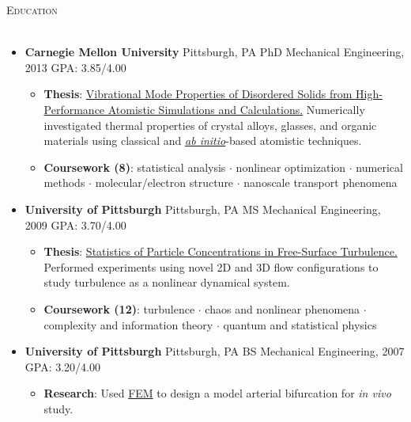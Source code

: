 \documentclass{article}
\newcommand{\area}[2]{\vspace*{-9pt} \begin{verse}\textbf{#1}   #2 \end{verse}  }
\newcommand{\lineunder}{\vspace*{-8pt} \\ \hspace*{-18pt} \hrulefill \\}
\newcommand{\header}[1]{{\hspace*{-15pt}\vspace*{6pt} \textsc{#1}} \vspace*{-6pt} \lineunder}
\newcommand{\schoolwithcourses}[3]{
 \textbf{#1} #2 $\bullet$ #3\\ 
\vspace*{5pt}
}
\begin{document}
\header{Education}

\begin{itemize}[leftmargin=*]
  \item \textbf{Carnegie Mellon University} Pittsburgh, PA PhD Mechanical Engineering, 2013 GPA: 3.85/4.00
  \begin{itemize}
    \item \textbf{Thesis}: \href{http://jasonlarkin.github.io/projects-phd.html}
    {Vibrational Mode Properties of Disordered Solids from High-Performance Atomistic Simulations and Calculations.}
Numerically investigated thermal properties of crystal alloys, glasses, and organic materials using classical and \href{http://en.wikipedia.org/wiki/Ab_initio_quantum_chemistry_methods}{\emph{ab initio}}-based atomistic techniques.
    \item \textbf{Coursework (8)}: statistical analysis $\cdot$ nonlinear optimization $\cdot$ numerical methods $\cdot$ molecular/electron structure $\cdot$ nanoscale transport phenomena  
  \end{itemize}

  \item \textbf{University of Pittsburgh} Pittsburgh, PA MS Mechanical Engineering, 2009 GPA: 3.70/4.00
  \begin{itemize}
    \item \textbf{Thesis}: \href{http://jasonlarkin.github.io/projects-ms.html}{Statistics of Particle Concentrations in Free-Surface Turbulence.} Performed experiments using novel 2D and 3D flow configurations to study turbulence as a nonlinear dynamical system.

    \item \textbf{Coursework (12)}: turbulence $\cdot$ chaos and nonlinear phenomena $\cdot$ complexity and information theory $\cdot$ quantum and statistical physics 
  \end{itemize}

  \item \textbf{University of Pittsburgh} Pittsburgh, PA BS Mechanical Engineering, 2007 GPA: 3.20/4.00
  \begin{itemize}
    \item \textbf{Research}: Used \href{http://en.wikipedia.org/wiki/Finite_element_method}{FEM} to design a model arterial bifurcation for \emph{in vivo} study.
  \end{itemize}


\end{itemize}
\end{document}
